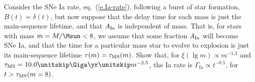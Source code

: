 \begin{exercisebox}
Consider the SNe Ia rate, eq.~(\ref{e.Ia-rate}), following a burst of star formation, $B(t) = \delta(t)$, but now suppose that the delay time for each mass is just the main-sequence lifetime, and that $A_{\mathrm{Ia}}$ is independent of mass. That is, for stars with mass $m =  M/\Msun< 8$, we assume that some fraction $A_{\mathrm{Ia}}$ will become SNe Ia, and that the time for a particular mass star to evolve to explosion is just its main-sequence lifetime $\tau(m) = \tau_{\mathrm{MS}}(m)$. Show that, for $\xi(\lg m) \propto m^{-1.3}$ and $\tms = 10.0\nsp\Giga\yr \nsp m^{-2.5}$, the Ia rate is $\Gamma_{\mathrm{Ia}} \propto t^{-0.5}$, for $t > \tau_{\mathrm{MS}}(m=8)$.
\end{exercisebox}
